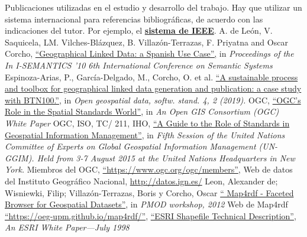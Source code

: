 \begin{thebibliography}{99}
     Publicaciones utilizadas en el estudio y desarrollo del trabajo.
        Hay que utilizar un sistema internacional para referencias bibliográficas, de acuerdo con las indicaciones del tutor. Por ejemplo, el \href{https://www.etsiinf.upm.es/docs/estudios/grado/1475_ieeecitationref.pdf}{\textbf{sistema de IEEE}}.
    A. de Le{\'o}n, V. Saquicela, LM. Vilches-Bl{\'a}zquez, B. Villaz{\'o}n-Terrazas, F. Priyatna and Oscar Corcho,
        \href{http://oa.upm.es/6167/}{``Geographical Linked Data: a Spanish Use Case'',}
        in \textit{Proceedings of the In I-SEMANTICS '10  6th International Conference on Semantic Systems}
    Espinoza-Arias, P., García-Delgado, M., Corcho, O. et al.
        \href{https://doi.org/10.1186/s40965-019-0060-4}{``A sustainable process and toolbox for geographical linked data generation and publication: a case study with BTN100.''},
        in \textit{Open geospatial data, softw. stand. 4, 2 (2019).}
     OGC,
        \href{portal.opengeospatial.org/files/?artifact_id=6207&ei=haJwVY7ZOcfusAXb4oK4DA&usg=AFQjCNEKzXyIOXuYNii4cRrwGU6wfD4BgQ&sig2=41F6mU19BEdW_td2wCIrIQ&bvm=bv.94911696,d.b2w}{``OGC’s Role in the Spatial Standards World''},
        in \textit{An Open GIS Consortium (OGC) White Paper}
    OGC, ISO, TC/ 211, IHO,
        \href{http://ggim.un.org/meetings/GGIM-committee/8th-Session/documents/Standards_Guide_2018.pdf}{``A Guide to the Role of Standards in Geospatial Information Management''},
        in \textit{Fifth Session of the United Nations Committee of Experts on Global Geospatial Information Management (UN-GGIM). Held from 3-7 August 2015 at the United Nations Headquarters in New York.}
    Miembros del OGC,
        \href{https://www.ogc.org/ogc/members}{``https://www.ogc.org/ogc/members''},
     Web de datos del Instituto Geográfico Nacional,
        \href{http://datos.ign.es/}{http://datos.ign.es/}
     Leon, Alexander de; Wisniewki, Filip; Villazón-Terrazas, Boris y Corcho, Oscar
        \href{http://oa.upm.es/14511/}{`` Map4rdf - Faceted Browser for Geospatial Datasets''},
        in \textit{PMOD workshop, 2012}
    Web de Map4rdf
        \href{https://oeg-upm.github.io/map4rdf/}{``https://oeg-upm.github.io/map4rdf/''},
        \href{https://support.esri.com/en/white-paper/279}{``ESRI Shapefile Technical Description''},
        \textit{An ESRI White Paper—July 1998}

\end{thebibliography}
